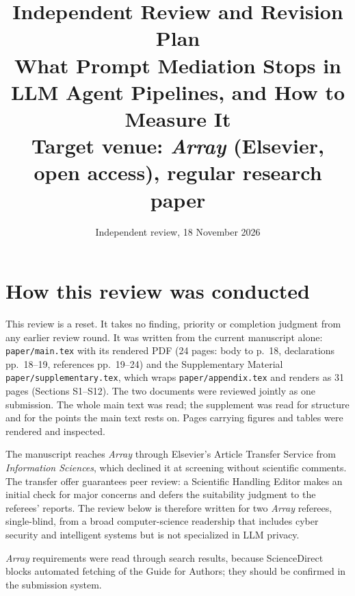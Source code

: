 \documentclass[10pt]{article}
\title{Independent Review and Revision Plan\\
\large What Prompt Mediation Stops in LLM Agent Pipelines, and How to Measure It\\
\normalsize Target venue: \emph{Array} (Elsevier, open access), regular research paper}
\author{Independent review, 18 November 2026}
\date{}
\newcommand{\src}[1]{\texttt{#1}}
\begin{document}
\maketitle

\section{How this review was conducted}
This review is a reset. It takes no finding, priority or completion judgment from any earlier review round. It was
written from the current manuscript alone: \src{paper/main.tex} with its rendered PDF (24 pages: body to p.~18,
declarations pp.~18--19, references pp.~19--24) and the Supplementary Material \src{paper/supplementary.tex}, which
wraps \src{paper/appendix.tex} and renders as 31 pages (Sections S1--S12). The two documents were reviewed jointly as
one submission. The whole main text was read; the supplement was read for structure and for the points the main text
rests on. Pages carrying figures and tables were rendered and inspected.

The manuscript reaches \emph{Array} through Elsevier's Article Transfer Service from \emph{Information Sciences}, which
declined it at screening without scientific comments. The transfer offer guarantees peer review: a Scientific Handling
Editor makes an initial check for major concerns and defers the suitability judgment to the referees' reports. The
review below is therefore written for two \emph{Array} referees, single-blind, from a broad computer-science
readership that includes cyber security and intelligent systems but is not specialized in LLM privacy.

\emph{Array} requirements were read through search results, because ScienceDirect blocks automated fetching of the
Guide for Authors; they should be confirmed in the submission system.
\end{document}
